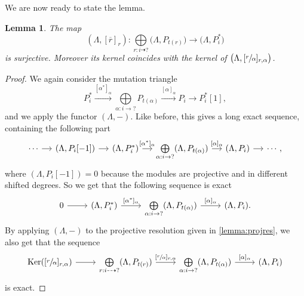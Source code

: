 \documentclass[12pt, dvipsnames, oneside]{amsart}
\DeclareMathOperator{\Ker}{Ker}
\newtheorem{lemma}[theorem]{Lemma}
\theoremstyle{definition}
\begin{document}
We are now ready to state the lemma.



\begin{lemma}\label{lemma:homLambdaPi}
The map
$$(\Lambda, [\overline{r}]_r)\colon  \bigoplus\limits_{r:i\dashrightarrow ?}\big(\Lambda, P_{t(r)}\big) \rightarrow \big(\Lambda, P_{i}^*\big)$$
is surjective. Moreover its kernel coincides with the kernel of $\big( \Lambda, [\sfrac{r}{\alpha}]_{r,\alpha} \big)$.

\end{lemma}

\begin{proof}
We again consider the mutation triangle
\begin{equation*}\label{eq:mutationTriangle}
P_i^*\xrightarrow{[\alpha^*]_{\alpha}} \bigoplus\limits_{\alpha: i\rightarrow ?} P_{t(\alpha)} \xrightarrow{[\alpha]_{\alpha}} P_i \rightarrow P_i^*[1],
\end{equation*}
and we apply the functor $(\Lambda, -)$. Like before, this gives a long exact sequence, containing the following part
\begin{equation*}
\begin{tikzcd}[column sep = small]
\cdots \arrow[r] & (\Lambda, P_i[-1]) \arrow[r] & (\Lambda, P_i^*) \arrow[r, "{[\alpha^*]_{\alpha}}"]  & \bigoplus\limits_{\alpha:i\rightarrow ?}(\Lambda, P_{t(\alpha)})  \arrow[r, "{[\alpha]_{\alpha}}"] & (\Lambda, P_i) \arrow[r] & \cdots,
\end{tikzcd}
\end{equation*}
where $(\Lambda, P_i[-1])=0$ because the modules are projective and in different shifted degrees. So we get that the following sequence is exact
\begin{equation*}
\begin{tikzcd}
0 \arrow[r] & (\Lambda, P_i^*) \arrow[r, "{[\alpha^*]_{\alpha}}"]  & \bigoplus\limits_{\alpha:i\rightarrow ?}(\Lambda, P_{t(\alpha)})  \arrow[r, "{[\alpha]_{\alpha}}"] & (\Lambda, P_i).
\end{tikzcd}
\end{equation*}
By applying $(\Lambda, - )$ to the projective resolution given in \cref{lemma:projres}, we also get that the sequence
\begin{equation*}
\begin{tikzcd}
\Ker([\sfrac{r}{\alpha}]_{r,\alpha}) \arrow[r] & \bigoplus\limits_{r:i\dashrightarrow ?}(\Lambda, P_{t(r)}) \arrow[r, "{[\sfrac{r}{\alpha}]_{r, \alpha}}"]  & \bigoplus\limits_{\alpha:i\rightarrow ?}(\Lambda, P_{t(\alpha)})  \arrow[r, "{[\alpha]_{\alpha}}"] & (\Lambda, P_i)
\end{tikzcd}
\end{equation*}
is exact.


\end{proof}
\end{document}
